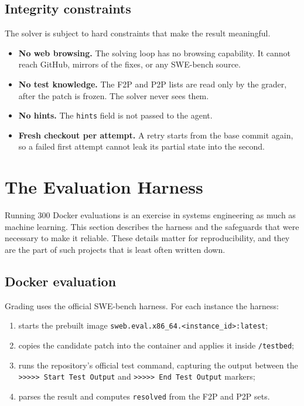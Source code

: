 \documentclass[11pt,a4paper]{article}
\begin{document}
\subsection{Integrity constraints}

The solver is subject to hard constraints that make the result meaningful.

\begin{itemize}[leftmargin=1.4em]
  \item \textbf{No web browsing.} The solving loop has no browsing capability. It cannot
  reach GitHub, mirrors of the fixes, or any SWE-bench source.
  \item \textbf{No test knowledge.} The F2P and P2P lists are read only by the grader,
  after the patch is frozen. The solver never sees them.
  \item \textbf{No hints.} The \texttt{hints} field is not passed to the agent.
  \item \textbf{Fresh checkout per attempt.} A retry starts from the base commit again,
  so a failed first attempt cannot leak its partial state into the second.
\end{itemize}

\section{The Evaluation Harness}
\label{sec:harness}

Running 300 Docker evaluations is an exercise in systems engineering as much as machine
learning. This section describes the harness and the safeguards that were necessary to
make it reliable. These details matter for reproducibility, and they are the part of such
projects that is least often written down.

\subsection{Docker evaluation}

Grading uses the official SWE-bench harness. For each instance the harness:

\begin{enumerate}[leftmargin=1.4em]
  \item starts the prebuilt image \texttt{sweb.eval.x86\_64.<instance\_id>:latest};
  \item copies the candidate patch into the container and applies it inside
  \texttt{/testbed};
  \item runs the repository's official test command, capturing the output between the
  \texttt{>>>>> Start Test Output} and \texttt{>>>>> End Test Output} markers;
  \item parses the result and computes \texttt{resolved} from the F2P and P2P sets.
\end{enumerate}
\end{document}
